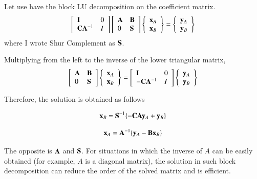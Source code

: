 Let use have the block LU decomposition on the coefficient matrix. 
%
\begin{eqnarray}
\left[\begin{array}{ll}
\mathbf{I} & 0\\
\mathbf{C}\mathbf{A}^{-1} & I
\end{array}\right]
\left[\begin{array}{ll}
\mathbf{A} & \mathbf{B}\\
0 & \mathbf{S}
\end{array}\right]
\left\{\begin{array}{l}
\mathbf{x}_A\\ \mathbf{x}_B
\end{array}\right\}
=
\left\{\begin{array}{l}
\mathbf{y}_A\\
\mathbf{y}_B
\end{array}\right\}
\end{eqnarray}
where  I wrote Shur Complement as $\mathbf{S}$.


Multiplying from the left to the inverse of the lower triangular matrix,
%
\begin{eqnarray}
\left[\begin{array}{ll}
\mathbf{A} & \mathbf{B}\\
0 & \mathbf{S}
\end{array}\right]
\left\{\begin{array}{l}\mathbf{x}_A\\ \mathbf{x}_B\end{array}\right\}
=
\left[\begin{array}{ll}
\mathbf{I} & 0\\
-\mathbf{C}\mathbf{A}^{-1} & I
\end{array}\right]
\left\{\begin{array}{l}\mathbf{y}_A\\ \mathbf{y}_B\end{array}\right\}
\end{eqnarray}

Therefore, the solution is obtained as follows

\begin{equation}
\mathbf{x}_B = \mathbf{S}^{-1}\{-\mathbf{C}\mathbf{A}\mathbf{y}_A + \mathbf{y}_B\}
\end{equation}


\begin{equation}
\mathbf{x}_A = \mathbf{A}^{-1}\{\mathbf{y}_A - \mathbf{B} \mathbf{x}_B\}
\end{equation}

The opposite is $\mathbf{A}$ and $\mathbf{S}$. For situations in which the inverse of $A$ can be easily obtained (for example, $A$ is a diagonal matrix), the solution in such block decomposition can reduce the order of the solved matrix and is efficient.

